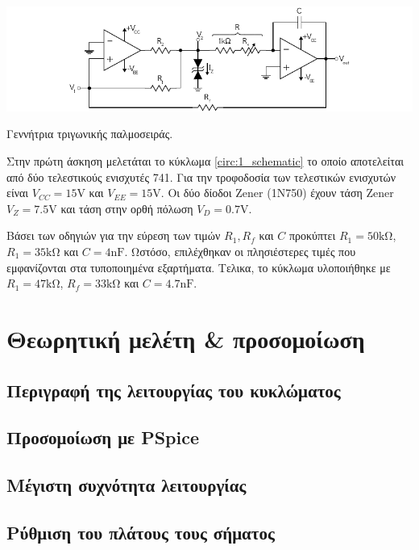 \begin{center}
	\begin{circuitfig}[H]
		\includegraphics[width=\textwidth]{circuits/micro3_lab1.pdf}
		\caption{Γεννήτρια τριγωνικής παλμοσειράς.}
		\label{circ:1_schematic}
	\end{circuitfig}
\end{center}

Στην πρώτη άσκηση μελετάται το κύκλωμα \ref{circ:1_schematic} το οποίο αποτελείται από δύο τελεστικούς ενισχυτές 741. Για την τροφοδοσία των τελεστικών ενισχυτών είναι $V_{CC}=15\unit{\volt}$ και $V_{EE}=15\unit{\volt}$. Οι δύο δίοδοι Zener (1N750) έχουν τάση Zener $V_Z=7.5\unit{\volt}$ και τάση στην ορθή πόλωση $V_D=0.7\unit{\volt}$.\par
Βάσει των οδηγιών για την εύρεση των τιμών $R_1,R_f$ και $C$ προκύπτει $R_1=50\unit{\kilo\ohm}$, $R_1=35\unit{\kilo\ohm}$ και $C=4\unit{\nano\farad}$. Ωστόσο, επιλέχθηκαν οι πλησιέστερες τιμές που εμφανίζονται στα τυποποιημένα εξαρτήματα. Τελικα, το κύκλωμα υλοποιήθηκε με $R_1=47\unit{\kilo\ohm}$, $R_f=33\unit{\kilo\ohm}$ και $C=4.7\unit{\nano\farad}$.\par

\section{Θεωρητική μελέτη \& προσομοίωση}

	\subsection{Περιγραφή της λειτουργίας του κυκλώματος}

	\subsection{Προσομοίωση με PSpice}

	\subsection{Μέγιστη συχνότητα λειτουργίας}

	\subsection{Ρύθμιση του πλάτους τους σήματος}

